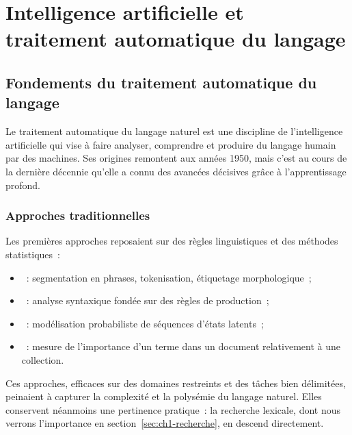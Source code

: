 \section{Intelligence artificielle et traitement automatique du langage}
\label{sec:ch1-tal}

\subsection{Fondements du traitement automatique du langage}

Le traitement automatique du langage naturel est une discipline de
l'intelligence artificielle qui vise à faire analyser, comprendre et produire du
langage humain par des machines. Ses origines remontent aux années 1950, mais
c'est au cours de la dernière décennie qu'elle a connu des avancées décisives
grâce à l'apprentissage profond.

\subsubsection{Approches traditionnelles}

Les premières approches reposaient sur des règles linguistiques et des méthodes
statistiques~:

\begin{itemize}
  \item {}~: segmentation en phrases,
        tokenisation, étiquetage morphologique~;
  \item {}~: analyse syntaxique fondée sur des
        règles de production~;
  \item {}~: modélisation probabiliste de
        séquences d'états latents~;
  \item {}~: mesure de l'importance d'un terme dans un
        document relativement à une collection.
\end{itemize}

Ces approches, efficaces sur des domaines restreints et des tâches bien
délimitées, peinaient à capturer la complexité et la polysémie du langage
naturel. Elles conservent néanmoins une pertinence pratique~: la recherche
lexicale, dont nous verrons l'importance en
section~\ref{sec:ch1-recherche}, en descend directement.

